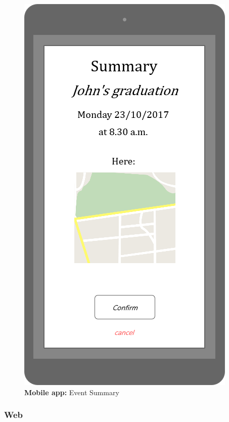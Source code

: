 \documentclass{article}
\begin{document}
\begin{figure}[H]
			\includegraphics[width=\linewidth]{Images/Mockup/Mobile/05-Summary.png}
			\caption{\textbf{Mobile app:} Event Summary}\label{fig:MU5}
			\endminipage
			\end{figure}
		\newpage
		\subsubsection{Web}
\end{document}
